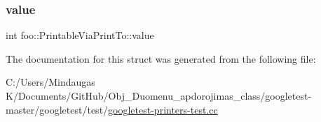 \subsubsection{\texorpdfstring{value}{value}}
{\footnotesize\ttfamily int foo\+::\+Printable\+Via\+Print\+To\+::value}



The documentation for this struct was generated from the following file\+:\begin{DoxyCompactItemize}
\item 
C\+:/\+Users/\+Mindaugas K/\+Documents/\+Git\+Hub/\+Obj\+\_\+\+Duomenu\+\_\+apdorojimas\+\_\+class/googletest-\/master/googletest/test/\mbox{\hyperlink{googletest-master_2googletest_2test_2googletest-printers-test_8cc}{googletest-\/printers-\/test.\+cc}}\end{DoxyCompactItemize}
